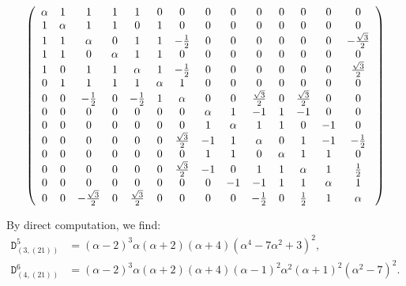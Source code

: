 \documentclass{article}
\theoremstyle{definition}
\newcommand{\Deltt}{{\mathtt D}}   %
\newcommand{\Delttt}[2]{\Deltt^{#1}_{(#2)}}  %
\numberwithin{equation}{subsection}
\begin{document}
\[
\left(
\begin{array}{ccccccc ccccccc}
 \alpha  & 1 & 1 & 1 & 1 & 0 & 0 & 0 & 0 & 0 & 0 & 0 & 0 & 0 \\
 1 & \alpha  & 1 & 1 & 0 & 1 & 0 & 0 & 0 & 0 & 0 & 0 & 0 & 0 \\
 1 & 1 & \alpha  & 0 & 1 & 1 & -\frac{1}{2} & 0 & 0 & 0 & 0 & 0 & 0 & -\frac{\sqrt{3}}{2} \\
 1 & 1 & 0 & \alpha  & 1 & 1 & 0 & 0 & 0 & 0 & 0 & 0 & 0 & 0 \\
 1 & 0 & 1 & 1 & \alpha  & 1 & -\frac{1}{2} & 0 & 0 & 0 & 0 & 0 & 0 & \frac{\sqrt{3}}{2} \\
 0 & 1 & 1 & 1 & 1 & \alpha  & 1 & 0 & 0 & 0 & 0 & 0 & 0 & 0 \\
 0 & 0 & -\frac{1}{2} & 0 & -\frac{1}{2} & 1 & \alpha  & 0 & 0 & \frac{\sqrt{3}}{2} & 0 & \frac{\sqrt{3}}{2} & 0 & 0 
 \\ %
 0 & 0 & 0 & 0 & 0 & 0 & 0 & \alpha  & 1 & -1 & 1 & -1 & 0 & 0 \\
 0 & 0 & 0 & 0 & 0 & 0 & 0 & 1 & \alpha  & 1 & 1 & 0 & -1 & 0 \\
 0 & 0 & 0 & 0 & 0 & 0 & \frac{\sqrt{3}}{2} & -1 & 1 & \alpha  & 0 & 1 & -1 & -\frac{1}{2} \\
 0 & 0 & 0 & 0 & 0 & 0 & 0 & 1 & 1 & 0 & \alpha  & 1 & 1 & 0 \\
 0 & 0 & 0 & 0 & 0 & 0 & \frac{\sqrt{3}}{2} & -1 & 0 & 1 & 1 & \alpha  & 1 & \frac{1}{2} \\
 0 & 0 & 0 & 0 & 0 & 0 & 0 & 0 & -1 & -1 & 1 & 1 & \alpha  & 1 \\
 0 & 0 & -\frac{\sqrt{3}}{2} & 0 & \frac{\sqrt{3}}{2} & 0 & 0 & 0 & 0 & -\frac{1}{2} & 0 & \frac{1}{2} & 1 & \alpha 
\end{array}
\right)
\]

By direct computation, we find:
\begin{align*}\Delttt{5}{3,(21)}&= (\alpha -2)^3 \alpha  (\alpha +2) (\alpha +4)(\alpha ^4-7 \alpha ^2+3)^2,\\
\Delttt{6}{4,(21)}&=(\alpha -2)^3 \alpha  (\alpha +2) (\alpha +4)(\alpha -1)^2 \alpha^2(\alpha +1)^2 \left(\alpha ^2-7\right)^2.
\end{align*}
\end{document}
